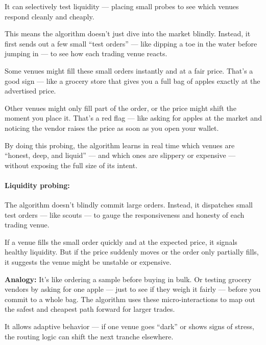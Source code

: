   It can selectively test liquidity — placing small probes to see which venues respond cleanly and cheaply.

  This means the algorithm doesn’t just dive into the market blindly. Instead, it first sends out a few small “test orders” — like dipping a toe in the water before jumping in — to see how each trading venue reacts.
  
  Some venues might fill these small orders instantly and at a fair price. That’s a good sign — like a grocery store that gives you a full bag of apples exactly at the advertised price.
  
  Other venues might only fill part of the order, or the price might shift the moment you place it. That’s a red flag — like asking for apples at the market and noticing the vendor raises the price as soon as you open your wallet.
  
  By doing this probing, the algorithm learns in real time which venues are “honest, deep, and liquid” — and which ones are slippery or expensive — without exposing the full size of its intent.


  \paragraph{Liquidity probing:} 
  The algorithm doesn’t blindly commit large orders. Instead, it dispatches small test orders — like scouts — to gauge the responsiveness and honesty of each trading venue.
  
  If a venue fills the small order quickly and at the expected price, it signals healthy liquidity. But if the price suddenly moves or the order only partially fills, it suggests the venue might be unstable or expensive.
  
  \textbf{Analogy:} 
  It’s like ordering a sample before buying in bulk. Or testing grocery vendors by asking for one apple — just to see if they weigh it fairly — before you commit to a whole bag. The algorithm uses these micro-interactions to map out the safest and cheapest path forward for larger trades.
  















  It allows adaptive behavior — if one venue goes “dark” or shows signs of stress, the routing logic can shift the next tranche elsewhere.

